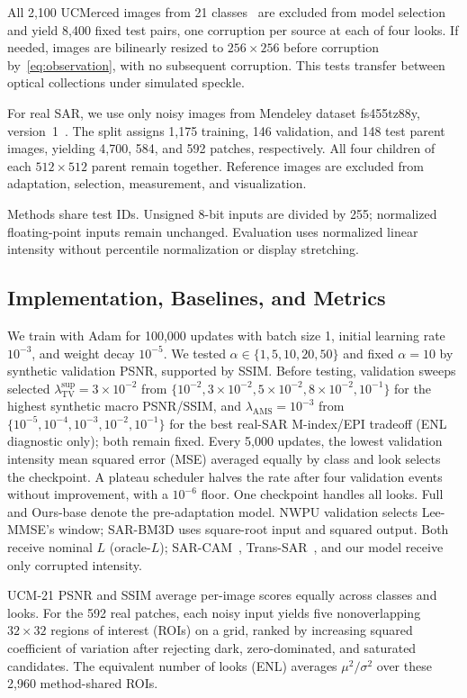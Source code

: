 \documentclass[journal]{IEEEtran}
\begin{document}
All 2,100 UCMerced images from 21 classes~\cite{yang2010} are excluded from model selection and yield 8,400 fixed test pairs, one corruption per source at each of four looks. If needed, images are bilinearly resized to \(256\times256\) before corruption by~\eqref{eq:observation}, with no subsequent corruption. This tests transfer between optical collections under simulated speckle.

For real SAR, we use only noisy images from Mendeley dataset fs455tz88y, version~1~\cite{vasquez2024data}. The split assigns 1,175 training, 146 validation, and 148 test parent images, yielding 4,700, 584, and 592 patches, respectively. All four children of each \(512\times512\) parent remain together. Reference images are excluded from adaptation, selection, measurement, and visualization.

Methods share test IDs. Unsigned 8-bit inputs are divided by 255; normalized floating-point inputs remain unchanged. Evaluation uses normalized linear intensity without percentile normalization or display stretching.

\subsection{Implementation, Baselines, and Metrics}
We train with Adam for 100,000 updates with batch size 1, initial learning rate \(10^{-3}\), and weight decay \(10^{-5}\). We tested \(\alpha\in\{1,5,10,20,50\}\) and fixed \(\alpha=10\) by synthetic validation PSNR, supported by SSIM. Before testing, validation sweeps selected \(\lambda_{\mathrm{TV}}^{\mathrm{sup}}=3\times10^{-2}\) from \(\{10^{-2},3\times10^{-2},5\times10^{-2},8\times10^{-2},10^{-1}\}\) for the highest synthetic macro PSNR/SSIM, and \(\lambda_{\mathrm{AMS}}=10^{-3}\) from \(\{10^{-5},10^{-4},10^{-3},10^{-2},10^{-1}\}\) for the best real-SAR M-index/EPI tradeoff (ENL diagnostic only); both remain fixed. Every 5,000 updates, the lowest validation intensity mean squared error (MSE) averaged equally by class and look selects the checkpoint. A plateau scheduler halves the rate after four validation events without improvement, with a \(10^{-6}\) floor. One checkpoint handles all looks. Full and Ours-base denote the pre-adaptation model. NWPU validation selects Lee-MMSE's window; SAR-BM3D uses square-root input and squared output. Both receive nominal \(L\) (oracle-\(L\)); SAR-CAM~\cite{ko2022}, Trans-SAR~\cite{perera2022}, and our model receive only corrupted intensity.

UCM-21 PSNR and SSIM average per-image scores equally across classes and looks. For the 592 real patches, each noisy input yields five nonoverlapping \(32\times32\) regions of interest (ROIs) on a grid, ranked by increasing squared coefficient of variation after rejecting dark, zero-dominated, and saturated candidates. The equivalent number of looks (ENL) averages \(\mu^2/\sigma^2\) over these 2,960 method-shared ROIs.
\end{document}
